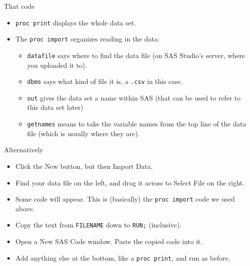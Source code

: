 \documentclass[unknownkeysallowed]{beamer}\usepackage[]{graphicx}\usepackage[]{color}
\begin{document}
\begin{frame}[fragile]{That code}
  
  \begin{itemize}
  \item \texttt{proc print} displays the whole data set.
  \item The \texttt{proc import} organizes reading in the data:
    \begin{itemize}
    \item \texttt{datafile} says where to find the data file (on SAS
      Studio's server, where you uploaded it to).
    \item \texttt{dbms} says what kind of file it is, a \texttt{.csv}
      in this case.
    \item \texttt{out} gives the data set a name within SAS (that can
      be used to refer to this data set later)
    \item \texttt{getnames} means to take the variable names from the
      top line of the data file (which is usually where they are). 
    \end{itemize}
  \end{itemize}
  
\end{frame}

\begin{frame}[fragile]{Alternatively}
  
  \begin{itemize}
  \item Click the New button, but then Import Data.
  \item Find your data file on the left, and drag it across to Select
    File on the right.
  \item Some code will appear. This is (basically) the \texttt{proc
      import} code we used above.
  \item Copy the text from \texttt{FILENAME} down to \texttt{RUN;}
    (inclusive).
  \item Open a New SAS Code window. Paste the copied code into it.
  \item Add anything else at the bottom, like a \texttt{proc print},
    and run as before.
  \end{itemize}
  
\end{frame}
\end{document}
